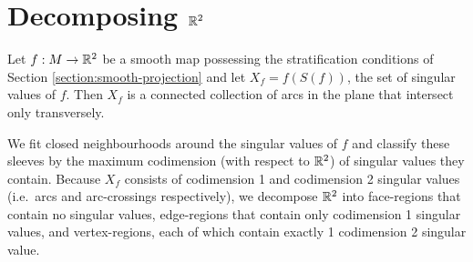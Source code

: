 \section{Decomposing $\mathbb{R}^2$}

Let $f:M\to\mathbb{R}^2$ be a smooth map possessing the stratification conditions of Section \ref{section:smooth-projection} and let $X_f = f(S(f))$, the set of singular values of $f$.
Then $X_f$ is a connected collection of arcs in the plane that intersect only transversely.

We fit closed neighbourhoods around the singular values of $f$ and classify these sleeves by the maximum codimension (with respect to $\mathbb{R}^2$) of singular values they contain.
Because $X_f$ consists of codimension 1 and codimension 2 singular values (i.e.\ arcs and arc-crossings respectively), we decompose $\mathbb{R}^2$ into face-regions that contain no singular values, edge-regions that contain only codimension 1 singular values, and vertex-regions, each of which contain exactly 1 codimension 2 singular value.